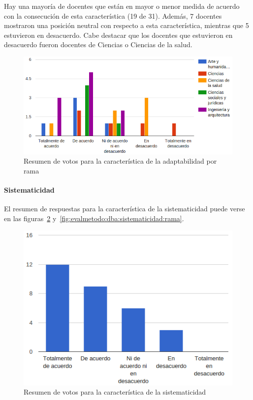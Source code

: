 Hay una mayoría de docentes que están en mayor o menor medida de acuerdo con la consecución de esta característica (19 de 31). Además, 7 docentes mostraron una posición neutral con respecto a esta característica, mientras que 5 estuvieron en desacuerdo. Cabe destacar que los docentes que estuvieron en desacuerdo fueron docentes de Ciencias o Ciencias de la salud.

\begin{figure}[h]
  \begin{center}
    \includegraphics[scale=0.5]{C_DBA_adaptabilidad_rama.png}
  \end{center}
  \caption{Resumen de votos para la característica de la adaptabilidad por rama}
  \label{fig:evalmetodo:dba:adaptabilidad:rama}
\end{figure}

\newpage
\paragraph*{Sistematicidad}

El resumen de respuestas para la característica de la sistematicidad puede verse en las figuras~\ref{fig:evalmetodo:dba:sistematicidad} y~\ref{fig:evalmetodo:dba:sistematicidad:rama}.

\begin{figure}[h]
  \begin{center}
    \includegraphics[scale=0.5]{C_DBA_sistematicidad.png}
  \end{center}
  \caption{Resumen de votos para la característica de la sistematicidad}
  \label{fig:evalmetodo:dba:sistematicidad}
\end{figure}

